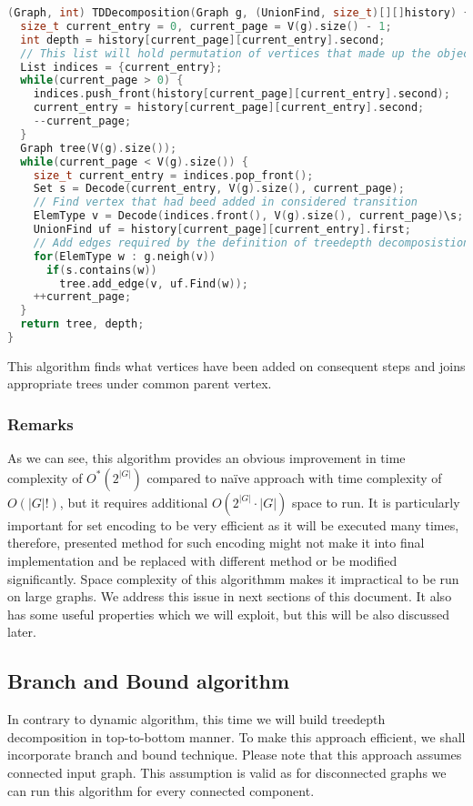 \begin{lstlisting}[language=C++]
(Graph, int) TDDecomposition(Graph g, (UnionFind, size_t)[][]history) {
  size_t current_entry = 0, current_page = V(g).size() - 1;
  int depth = history[current_page][current_entry].second;
  // This list will hold permutation of vertices that made up the object in history[current_page][current_entry]
  List indices = {current_entry};
  while(current_page > 0) {
    indices.push_front(history[current_page][current_entry].second);
    current_entry = history[current_page][current_entry].second;
    --current_page;
  }
  Graph tree(V(g).size());
  while(current_page < V(g).size()) {
    size_t current_entry = indices.pop_front();
    Set s = Decode(current_entry, V(g).size(), current_page);
    // Find vertex that had beed added in considered transition
    ElemType v = Decode(indices.front(), V(g).size(), current_page)\s;
    UnionFind uf = history[current_page][current_entry].first;
    // Add edges required by the definition of treedepth decomposistion
    for(ElemType w : g.neigh(v))
      if(s.contains(w))
        tree.add_edge(v, uf.Find(w));
    ++current_page;
  }
  return tree, depth;
}
\end{lstlisting}
This algorithm finds what vertices have been added on consequent steps and joins appropriate trees under common parent vertex.
\subsubsection{Remarks}
As we can see, this algorithm provides an obvious improvement in time complexity of $O^{*}\left(2^{\left|G\right|}\right)$ compared to na\"ive approach with time complexity of $O\left(\left|G\right|!\right)$, but it requires additional $O\left(2^{\left|G\right|}\cdot\left|G\right|\right)$ space to run. It is particularly important for set encoding to be very efficient as it will be executed many times, therefore, presented method for such encoding might not make it into final implementation and be replaced with different method or be modified significantly. Space complexity of this algorithmm makes it impractical to be run on large graphs. We address this issue in next sections of this document. It also has some useful properties which we will exploit, but this will be also discussed later.
\subsection{Branch and Bound algorithm}
In contrary to dynamic algorithm, this time we will build treedepth decomposition in top-to-bottom manner. To make this approach efficient, we shall incorporate branch and bound technique. Please note that this approach assumes connected input graph. This assumption is valid as for disconnected graphs we can run this algorithm for every connected component.
